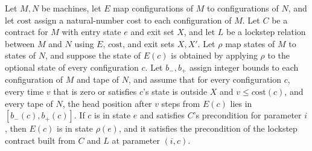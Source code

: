 \begin{theorem}
\label{Turing.Contract.lockstep_admissible_map}
\leanok
{}
Let $M,N$ be machines, let $E$ map configurations of $M$ to configurations of $N$, and
let $c\text{ost}$ assign a natural-number cost to each configuration of $M$. Let $C$ be
a contract for $M$ with entry state $e$ and exit set $X$, and let $L$ be a lockstep
relation between $M$ and $N$ using $E$, $c\text{ost}$, and exit sets $X,X'$. Let $\rho$
map states of $M$ to states of $N$, and suppose the state of $E(c)$ is obtained by
applying $\rho$ to the optional state of every configuration $c$. Let $b_-,b_+$ assign
integer bounds to each configuration of $M$ and tape of $N$, and assume that for every
configuration $c$, every time $v$ that is zero or satisfies $c$'s state is outside $X$
and $v\le c\text{ost}(c)$, and every tape of $N$, the head position after $v$ steps from
$E(c)$ lies in $[b_-(c),b_+(c)]$. If $c$ is in state $e$ and satisfies $C$'s
precondition for parameter $i$, then $E(c)$ is in state $\rho(e)$, and it satisfies the
precondition of the lockstep contract built from $C$ and $L$ at parameter $(i,c)$.
\end{theorem}

